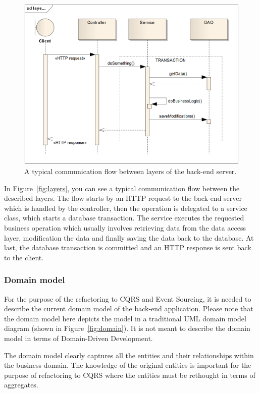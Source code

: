 \documentclass{book}
\begin{document}
\begin{figure}[h!]
\begin{center}
\includegraphics[width=0.8\columnwidth]{figures/layers/layers}
\caption{A typical communication flow between layers of the back-end server.%
}
\end{center}
\end{figure}

In Figure~\ref{fig:layers}, you can see a typical communication flow
between the described layers. The flow starts by an HTTP request to the
back-end server which is handled by the controller, then the operation
is delegated to a service class, which starts a database transaction.
The service executes the requested business operation which usually
involves retrieving data from the data access layer, modification the
data and finally saving the data back to the database. At last, the
database transaction is committed and an HTTP response is sent back to
the client.


\subsubsection{Domain model}\label{domain-model}

For the purpose of the refactoring to CQRS and Event Sourcing, it is
needed to describe the current domain model of the back-end application.
Please note that the domain model here depicts the model in a
traditional UML domain model diagram (shown in Figure~\ref{fig:domain}).
It is not meant to describe the domain model in terms of Domain-Driven
Development.

The domain model clearly captures all the entities and their
relationships within the business domain. The knowledge of the original
entities is important for the purpose of refactoring to CQRS where the
entities must be rethought in terms of aggregates.
\end{document}
